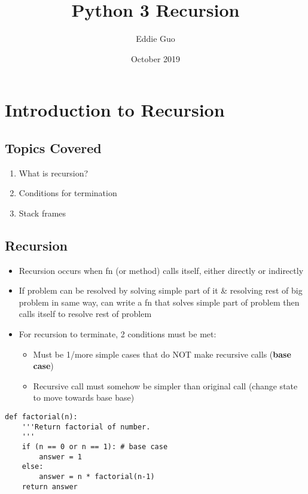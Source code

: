\documentclass{article}
\title{Python 3 Recursion}
\author{Eddie Guo}
\date{October 2019}
\begin{document}
\lstset{language=Python}
\maketitle

\section{Introduction to Recursion}
\subsection{Topics Covered}
    \begin{multicols}{2}
        \begin{enumerate}[label=(\roman*)]
            \item What is recursion?
            \item Conditions for termination
            \item Stack frames
        \end{enumerate}
    \end{multicols}

\subsection{Recursion}
    \begin{itemize}
        \item Recursion occurs when fn (or method) calls itself, either directly or indirectly
        \item If problem can be resolved by solving simple part of it \& resolving rest of big problem in same way, can write a fn that solves simple part of problem then calls itself to resolve rest of problem
        \item For recursion to terminate, 2 conditions must be met:
            \begin{itemize}
                \item Must be 1/more simple cases that do NOT make recursive calls (\textbf{base case})
                \item Recursive call must somehow be simpler than original call (change state to move towards base base)
            \end{itemize}
    \end{itemize}
\vspace{-1em}
\begin{lstlisting}
def factorial(n):
    '''Return factorial of number.
    '''
    if (n == 0 or n == 1): # base case
        answer = 1
    else:
        answer = n * factorial(n-1)
    return answer
\end{lstlisting}
\end{document}
